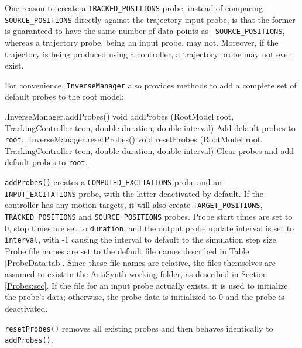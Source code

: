 \begin{sideblock}
One reason to create a {\tt TRACKED\_POSITIONS} probe, instead of comparing
{\tt SOURCE\_POSITIONS} directly against the trajectory input probe, is that
the former is guaranteed to have the same number of data points as {\tt
SOURCE\_POSITIONS}, whereas a trajectory probe, being an input probe, may
not. Moreover, if the trajectory is being produced using a controller,
a trajectory probe may not even exist.
\end{sideblock}

For convenience, {\tt InverseManager} also provides methods to add a complete
set of default probes to the root model:
%
\begin{methodtable}{0.6}{0.4}
\midline
%
\methodentry
{\inverse.InverseManager.addProbes()}%
{void addProbes (RootModel root, TrackingController tcon,\brh
double duration, double interval)}%
{Add default probes to {\tt root}.}%
%
\methodspace{0.5em}%
\methodentry
{\inverse.InverseManager.resetProbes()}%
{void resetProbes (RootModel root, TrackingController tcon,\brh
double duration, double interval)}%
{Clear probes and add default probes to {\tt root}.}%
%
\midline
\end{methodtable}
%
{\tt addProbes()} creates a {\tt COMPUTED\_EXCITATIONS} probe and an {\tt
INPUT\_EXCITATIONS} probe, with the latter deactivated by default.  If the
controller has any motion targets, it will also create {\tt TARGET\_POSITIONS},
{\tt TRACKED\_POSITIONS} and {\tt SOURCE\_POSITIONS} probes.  Probe start times
are set to 0, stop times are set to {\tt duration}, and the output probe update
interval is set to {\tt interval}, with -1 causing the interval to default to
the simulation step size. Probe file names are set to the default file names
described in Table \ref{ProbeData:tab}.  Since these file names are relative,
the files themselves are assumed to exist in the ArtiSynth working folder, as
described in Section \ref{Probes:sec}. If the file for an input probe actually
exists, it is used to initialize the probe's data; otherwise, the probe data is
initialized to 0 and the probe is deactivated.

{\tt resetProbes()} removes all existing probes and then behaves identically to
{\tt addProbes()}.


